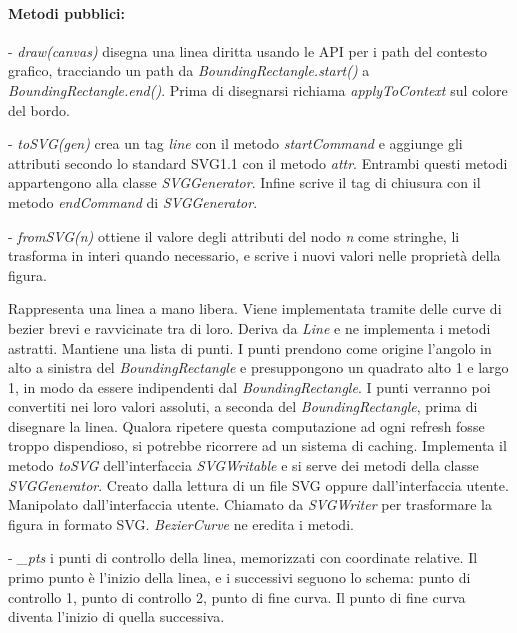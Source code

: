 \paragraph{Metodi pubblici:}
\begin{elencopuntato}[\subsubsecindent]
\item[-] \textit{draw(canvas)} disegna una linea diritta usando le API per i path del contesto grafico, tracciando un path da \textit{BoundingRectangle.start()} a \textit{BoundingRectangle.end()}. Prima di disegnarsi richiama \textit{applyToContext} sul colore del bordo.
\item[-] \textit{toSVG(gen)} crea un tag \textit{line} con il metodo \textit{startCommand} e aggiunge gli attributi secondo lo standard SVG1.1 con il metodo \textit{attr}. Entrambi questi metodi appartengono alla classe \textit{SVGGenerator}. Infine scrive il tag di chiusura con il metodo \textit{endCommand} di \textit{SVGGenerator}.
\item[-] \textit{fromSVG(n)} ottiene il valore degli attributi del nodo \textit{n} come stringhe, li trasforma in interi quando necessario, e scrive i nuovi valori nelle propriet\`a della figura. 
\end{elencopuntato}

Rappresenta una linea a mano libera. Viene implementata tramite delle curve di bezier brevi e ravvicinate tra di loro.
Deriva da \textit{Line} e ne implementa i metodi astratti. Mantiene una lista di punti. I punti prendono come origine l'angolo in alto a sinistra del \textit{BoundingRectangle} e presuppongono un quadrato alto 1 e largo 1, in modo da essere indipendenti dal \textit{BoundingRectangle}. I punti verranno poi convertiti nei loro valori assoluti, a seconda del \textit{BoundingRectangle}, prima di disegnare la linea. Qualora ripetere questa computazione ad ogni refresh fosse troppo dispendioso, si potrebbe ricorrere ad un sistema di caching. Implementa il metodo \textit{toSVG} dell'interfaccia \textit{SVGWritable} e si serve dei metodi della classe \textit{SVGGenerator}.
Creato dalla lettura di un file SVG oppure dall'interfaccia utente. Manipolato dall'interfaccia utente. Chiamato da \textit{SVGWriter} per trasformare la figura in formato SVG. \textit{BezierCurve} ne eredita i metodi.
\begin{elencopuntato}[\subsubsecindent]
\item[-] \textit{{\_}pts} i punti di controllo della linea, memorizzati con coordinate relative. Il primo punto \`e l'inizio della linea, e i successivi seguono lo schema: punto di controllo 1, punto di controllo 2, punto di fine curva. Il punto di fine curva diventa l'inizio di quella successiva.
\end{elencopuntato}
